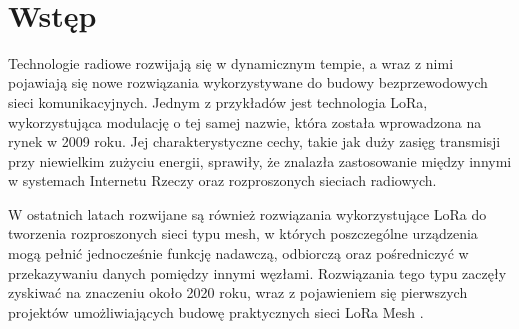 \documentclass[12pt,a4paper,twoside]{report}
\theoremstyle{definition} %
\begin{document}
    \linespread{1.3}
    \newpage 


    \thispagestyle{empty} %
    ~\vfill
	\newpage
    
	\renewcommand{\contentsname}{\LARGE Spis treści}
    \setcounter{tocdepth}{1}
    \tableofcontents
    \cleardoublepage %


    \cleardoublepage

	
	\chapter*{Wstęp} 
Technologie radiowe rozwijają się w dynamicznym tempie, a wraz z nimi pojawiają się nowe rozwiązania wykorzystywane do budowy bezprzewodowych sieci komunikacyjnych. Jednym z przykładów jest technologia LoRa, wykorzystująca modulację o tej samej nazwie, która została wprowadzona na rynek w 2009 roku. Jej charakterystyczne cechy, takie jak duży zasięg transmisji przy niewielkim zużyciu energii, sprawiły, że znalazła zastosowanie między innymi w systemach Internetu Rzeczy oraz rozproszonych sieciach radiowych.

W ostatnich latach rozwijane są również rozwiązania wykorzystujące LoRa do tworzenia rozproszonych sieci typu mesh, w których poszczególne urządzenia mogą pełnić jednocześnie funkcję nadawczą, odbiorczą oraz pośredniczyć w przekazywaniu danych pomiędzy innymi węzłami. Rozwiązania tego typu zaczęły zyskiwać na znaczeniu około 2020 roku, wraz z pojawieniem się pierwszych projektów umożliwiających budowę praktycznych sieci LoRa Mesh \cite{meshtastic_firmware}.
\end{document}

